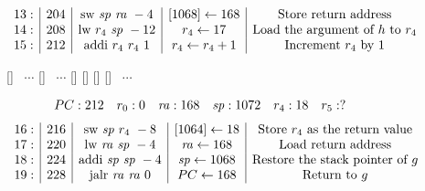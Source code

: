 \documentclass[acmsmall,review,anonymous]{acmart}\settopmatter{printfolios=true,printccs=false,printacmref=false}
\begin{document}
\begin{figure}
\[\begin{array}{r|c|c|c|c}
  13: & 204 & \text{sw} ~ \mathit{sp} ~ \mathit{ra} ~ -4 & [1068] \leftarrow 168 & \text{Store return address}\\
  14: & 208 & \text{lw} ~ r_4 ~ \mathit{sp} ~ -12 & r_4 \leftarrow 17 & \text{Load the argument of $h$ to $r_4$}\\
  15: & 212 & \text{addi} ~ r_4 ~ r_4 ~ 1 & r_4 \leftarrow r_4 + 1 & \text{Increment $r_4$ by 1}\\\end{array}
\]
\begin{center}
\MemoryLabel{52em}{1.8em}{$\downarrow$}
[{}]%
~$\cdots$
[{}]%
~$\cdots$
[{}]%
[{}]%
[{}]%
%
[{}]
~$\cdots$
\\
\end{center}
\[
\begin{array}{cccccc}
  PC: 212 & r_0 : 0 & \mathit{ra} : 168 & \mathit{sp} : 1072 & r_4 : 18 & r_5 : ? 
\end{array}
\]
\vspace*{0.2em}
\[
\begin{array}{r|c|c|c|c}
  16: & 216 & \text{sw} ~ \mathit{sp} ~ r_4 ~ -8 & [1064] \leftarrow 18 & \text{Store $r_4$ as the return value}\\
  17: & 220 & \text{lw} ~ \mathit{ra} ~ \mathit{sp} ~ -4 & \mathit{ra} \leftarrow 168 & \text{Load return address}\\
  18: & 224 & \text{addi} ~ \mathit{sp} ~ \mathit{sp} ~ -4 & \mathit{sp} \leftarrow 1068 & \text{Restore the stack pointer of $g$}\\
  19: & 228 & \text{jalr} ~ \mathit{ra} ~ \mathit{ra} ~ 0 & PC \leftarrow 168 & \text{Return to $g$}\\
  \end{array}
\]
\label{fig:running-trace-a}
\end{figure}
\end{document}
